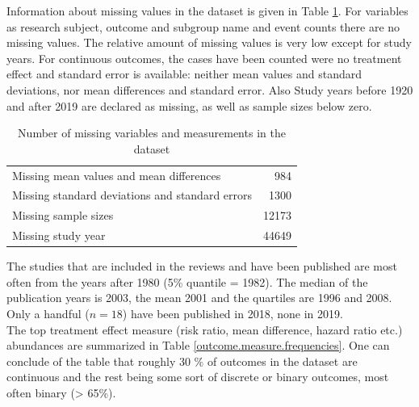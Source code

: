 \documentclass[11pt,a4paper,twoside]{book}\usepackage[]{graphicx}\usepackage[]{color}
\begin{document}
Information about missing values in the dataset is given in Table \ref{missing}. For variables as research subject, outcome and subgroup name and event counts there are no missing values. The relative amount of missing values is very low except for study years. For continuous outcomes, the cases have been counted were no treatment effect and standard error is available: neither mean values and standard deviations, nor mean differences and standard error. Also Study years before 1920 and after 2019 are declared as missing, as well as sample sizes below zero.

\begin{table}[ht]
\centering
\begingroup\footnotesize
\begin{tabular}{lr}
  \hline
  \hline
Missing mean values and mean differences & 984 \\ 
  Missing standard deviations and standard errors & 1300 \\ 
  Missing sample sizes & 12173 \\ 
  Missing study year & 44649 \\ 
   \hline
\end{tabular}
\endgroup
\caption{Number of missing variables and measurements in the dataset} 
\label{missing}
\end{table}


The studies that are included in the reviews and have been published are most often from the years after 1980 (5\% quantile = 1982). The median of the publication years is 2003, the mean 2001 and the quartiles are 1996 and 2008. Only a handful ($n = 18$) have been published in 2018, none in 2019. \\
The top treatment effect measure (risk ratio, mean difference, hazard ratio etc.) abundances are summarized in Table \ref{outcome.measure.frequencies}. One can conclude of the table that roughly 30 \% of outcomes in the dataset are continuous and the rest being some sort of discrete or binary outcomes, most often binary (> 65\%).
\end{document}
